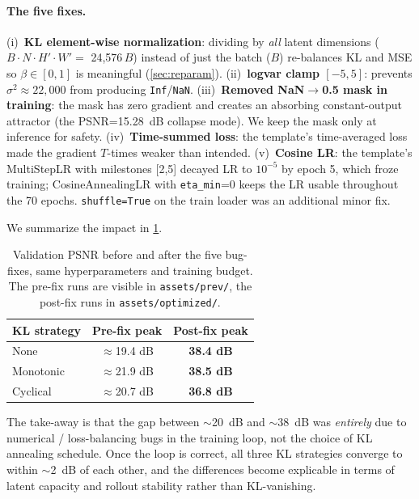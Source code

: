\documentclass[10pt,twocolumn,letterpaper]{article}
\begin{document}
\paragraph{The five fixes.} (i)~\textbf{KL element-wise normalization}: dividing by \emph{all} latent dimensions ($B \cdot N \cdot H' \cdot W' = $ 24,576$\,B$) instead of just the batch ($B$) re-balances KL and MSE so $\beta\!\in\![0,1]$ is meaningful (\cref{sec:reparam}). (ii)~\textbf{logvar clamp $[-5,5]$}: prevents $\sigma^2 \approx 22{,}000$ from producing \texttt{Inf}/\texttt{NaN}. (iii)~\textbf{Removed NaN$\to$0.5 mask in training}: the mask has zero gradient and creates an absorbing constant-output attractor (the PSNR=15.28~dB collapse mode). We keep the mask only at inference for safety. (iv)~\textbf{Time-summed loss}: the template's time-averaged loss made the gradient $T$-times weaker than intended. (v)~\textbf{Cosine LR}: the template's MultiStepLR with milestones [2,5] decayed LR to $10^{-5}$ by epoch 5, which froze training; CosineAnnealingLR with \texttt{eta\_min}=0 keeps the LR usable throughout the 70 epochs. \texttt{shuffle=True} on the train loader was an additional minor fix.

We summarize the impact in \cref{tab:bugfix}.

\begin{table}[h]
\centering
\small
\begin{tabular}{lcc}
\toprule
\textbf{KL strategy} & \textbf{Pre-fix peak} & \textbf{Post-fix peak} \\ \midrule
None      & $\approx$19.4 dB & \textbf{38.4 dB} \\
Monotonic & $\approx$21.9 dB & \textbf{38.5 dB} \\
Cyclical  & $\approx$20.7 dB & \textbf{36.8 dB} \\
\bottomrule
\end{tabular}
\caption{Validation PSNR before and after the five bug-fixes, same hyperparameters and training budget. The pre-fix runs are visible in \texttt{assets/prev/}, the post-fix runs in \texttt{assets/optimized/}.}
\label{tab:bugfix}
\end{table}

\noindent The take-away is that the gap between $\sim$20~dB and $\sim$38~dB was \emph{entirely} due to numerical / loss-balancing bugs in the training loop, not the choice of KL annealing schedule. Once the loop is correct, all three KL strategies converge to within $\sim$2~dB of each other, and the differences become explicable in terms of latent capacity and rollout stability rather than KL-vanishing.
\end{document}
